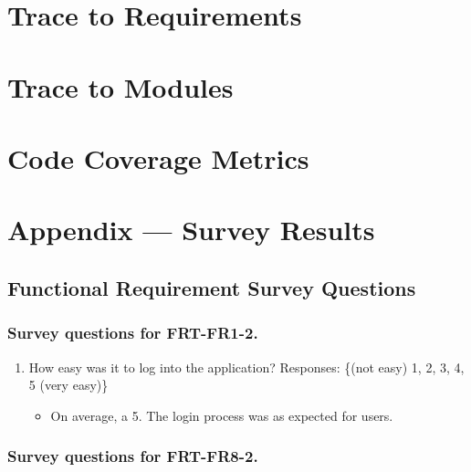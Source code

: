 \documentclass[12pt, titlepage]{article}
\begin{document}
\section{Trace to Requirements}
		
\section{Trace to Modules}		

\section{Code Coverage Metrics}




\newpage{}
\section{Appendix --- Survey Results}

\subsection{Functional Requirement Survey Questions}
\subsubsection{Survey questions for \textbf{FRT-FR1-2}.}

\begin{enumerate}
\item How easy was it to log into the application?
Responses: \{(not easy) 1, 2, 3, 4, 5 (very easy)\} \\
  \begin{itemize}
    \item On average, a 5. The login process was as expected for users.
  \end{itemize}
\end{enumerate}

\subsubsection{Survey questions for \textbf{FRT-FR8-2}.}
\end{document}
